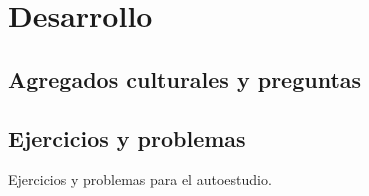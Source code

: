 \section{Desarrollo}

\subsection{Agregados culturales y preguntas}

\subsection{Ejercicios y problemas}

Ejercicios y problemas para el autoestudio.